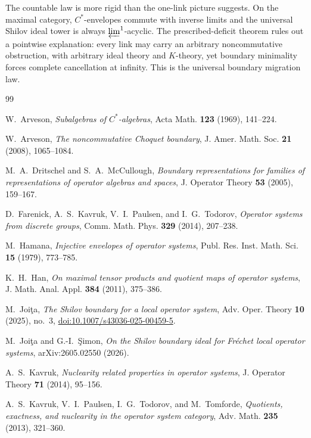 \documentclass[11pt,a4paper]{amsart}
\theoremstyle{plain}
\theoremstyle{definition}
\begin{document}
The countable law is more rigid than the one-link picture suggests.  On the maximal category,
$C^*$-envelopes commute with inverse limits and the universal Shilov ideal tower is always
$\varprojlim^1$-acyclic.  The prescribed-deficit theorem rules out a pointwise explanation: every
link may carry an arbitrary noncommutative obstruction, with arbitrary ideal theory and $K$-theory,
yet boundary minimality forces complete cancellation at infinity.  This is the universal boundary
migration law.

\begin{thebibliography}{99}

W.~Arveson,
\emph{Subalgebras of $C^*$-algebras},
Acta Math. \textbf{123} (1969), 141--224.

W.~Arveson,
\emph{The noncommutative Choquet boundary},
J. Amer. Math. Soc. \textbf{21} (2008), 1065--1084.

M.~A.~Dritschel and S.~A.~McCullough,
\emph{Boundary representations for families of representations of operator algebras and spaces},
J. Operator Theory \textbf{53} (2005), 159--167.

D.~Farenick, A.~S.~Kavruk, V.~I.~Paulsen, and I.~G.~Todorov,
\emph{Operator systems from discrete groups},
Comm. Math. Phys. \textbf{329} (2014), 207--238.

M.~Hamana,
\emph{Injective envelopes of operator systems},
Publ. Res. Inst. Math. Sci. \textbf{15} (1979), 773--785.

K.~H.~Han,
\emph{On maximal tensor products and quotient maps of operator systems},
J. Math. Anal. Appl. \textbf{384} (2011), 375--386.

M.~Joi\c{t}a,
\emph{The Shilov boundary for a local operator system},
Adv. Oper. Theory \textbf{10} (2025), no.~3,
\href{https://doi.org/10.1007/s43036-025-00459-5}{doi:10.1007/s43036-025-00459-5}.

M.~Joi\c{t}a and G.-I.~\c{S}imon,
\emph{On the Shilov boundary ideal for Fr\'echet local operator systems},
arXiv:2605.02550 (2026).

A.~S.~Kavruk,
\emph{Nuclearity related properties in operator systems},
J. Operator Theory \textbf{71} (2014), 95--156.

A.~S.~Kavruk, V.~I.~Paulsen, I.~G.~Todorov, and M.~Tomforde,
\emph{Quotients, exactness, and nuclearity in the operator system category},
Adv. Math. \textbf{235} (2013), 321--360.


\end{thebibliography}
\end{document}
